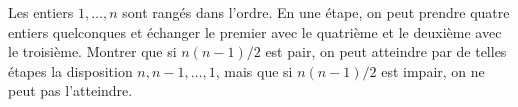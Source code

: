 Les entiers $1, \ldots, n$ sont rangés dans l'ordre. En une étape, on peut prendre quatre entiers quelconques et échanger le premier avec le quatrième et le deuxième avec le troisième. Montrer que si $n(n - 1)/2$ est pair, on peut atteindre par de telles étapes la disposition $n, n - 1, \ldots, 1$, mais que si $n(n - 1)/2$ est impair, on ne peut pas l'atteindre.
